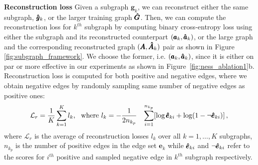 \documentclass{article}
\begin{document}
\textbf{Reconstruction loss} Given a subgraph $\pmb{g}_k$, we can reconstruct either the same subgraph, $\pmb{\Hat{g}}_k$, or the larger training graph $\pmb{\Hat{G}}$. 
Then, we can compute the reconstruction loss for $k^{th}$ subgraph by computing binary cross-entropy loss using either the subgraph and its reconstructed counterpart $(\pmb{a}_k, \pmb{\Hat{a}}_k)$, or the large graph and the corresponding reconstructed graph $(\pmb{A},\pmb{\Hat{A}}_k)$ pair as shown in Figure \ref{fig:subgraph_framework}. We choose the former, i.e. $(\pmb{a}_k, \pmb{\Hat{a}}_k)$, since it is either on par or more effective in our experiments as shown in Figure~\ref{fig:ness_ablation1}b. Reconstruction loss is computed for both positive and negative edges, where we obtain negative edges by randomly sampling same number of negative edges as positive ones: 
\begin{equation}\label{eq3}
\begin{aligned}
&\mathcal{L}_r = \frac{1}{K}\sum_{k=1}^{K} l_k \mbox{, \, where }
l_k = -\frac{1}{2n_{k_p}} &\sum_{i=1}^{n_{k_p}} [ \log \pmb{\Hat{e}}_{ki} + \log(1-\lnot\pmb{\Hat{e}}_{ki})]\,,
 \end{aligned}
\end{equation}
where $\mathcal{L}_r$ is the average of reconstruction losses $l_k$ over all $k=1,\ldots,K$ subgraphs, $n_{k_p}$ is the number of positive edges in the edge set $\pmb{e}_k$ while $\pmb{\Hat{e}}_{ki}$ and $\lnot\pmb{\Hat{e}}_{ki}$ refer to the scores for $i^{th}$ positive and sampled negative edge in $k^{th}$ subgraph respectively.
\end{document}
